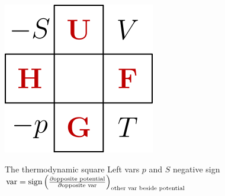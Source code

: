 \documentclass{article}
\theoremstyle{remark}
\begin{document}
\begin{enumerate}
\begin{minipage}{0.3\linewidth}
            \includegraphics*[width=\linewidth]{Thermodynamic_square.png}
        \end{minipage}

        The thermodynamic square\newline
        \newline
        Left vars $p$ and $S$ negative sign\newline
        $\text{var}=\text{sign}\left(\pdv{\text{opposite potential}}{\text{opposite var}}\right)_{\text{other var beside potential}}$


\end{enumerate}
\end{document}
